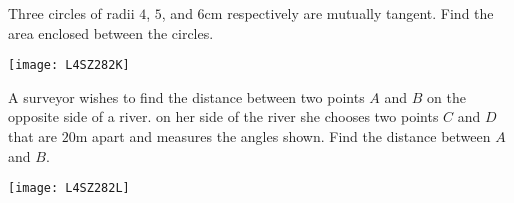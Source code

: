 \begin{Exercise}[title={Applications},label=exApplications]
\begin{multicols}{2}
	\Question Three circles of radii $4$, $5$, and $6 \mbox{cm}$ respectively are mutually tangent. Find the area enclosed between the circles.%
	\columnbreak 
	
	\texttt{[image: L4SZ282K]}	\\
\end{multicols}	

\begin{multicols}{2}
	\Question A surveyor wishes to find the distance between two points $A$ and $B$ on the opposite side of a river. on her side of the river she chooses two points $C$ and $D$ that are $20 \mbox{m}$ apart and measures the angles shown. Find	the distance between $A$ and $B\text{.}$%
	\columnbreak 
	
	\texttt{[image: L4SZ282L]}	\\
\end{multicols}	
\end{Exercise}%
